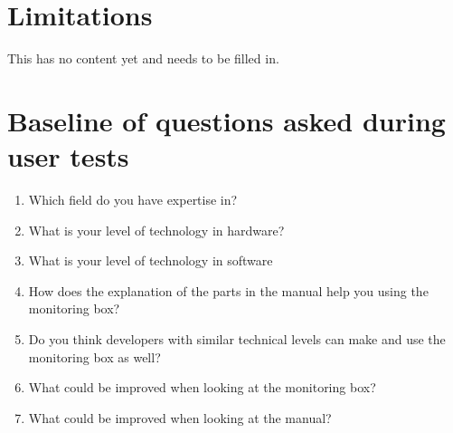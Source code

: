 \documentclass[conference]{IEEEtran}
\begin{document}
\section{Limitations}
This has no content yet and needs to be filled in. 





\appendices
\section{Baseline of questions asked during user tests}
\begin{enumerate}
\item Which field do you have expertise in?
\item What is your level of technology in hardware?
\item What is your level of technology in software
\item How does the explanation of the parts in the manual help you using the monitoring box?
\item Do you think developers with similar technical levels can make and use the monitoring box as well?\item What could be improved when looking at the monitoring box?
\item What could be improved when looking at the manual?
\end{enumerate}
\end{document}
